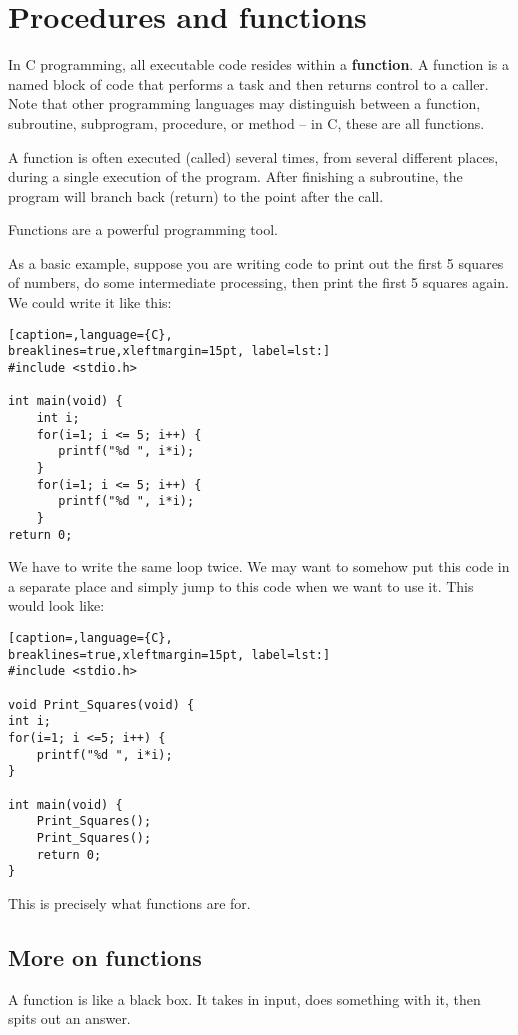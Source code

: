 \section{Procedures and functions}
In C programming, all executable code resides within a \textbf{function}. A
function is a named block of code that performs a task and then returns control
to a caller. Note that other programming languages may distinguish between a
function, subroutine, subprogram, procedure, or method --
in C, these are all functions.

A function is often executed (called) several times, from several different
places, during a single execution of the program.  After finishing a
subroutine, the program will branch back (return) to the point after the call.

Functions are a powerful programming tool.

As a basic example, suppose you are writing code to print out the first 5
squares of numbers, do some intermediate processing, then print the first 5
squares again. We could write it like this:
\lstset{basicstyle=\scriptsize, numbers=left, captionpos=b, tabsize=4}
\begin{lstlisting}[caption=,language={C},
breaklines=true,xleftmargin=15pt, label=lst:]
#include <stdio.h>

int main(void) {
	int i;
	for(i=1; i <= 5; i++) {
	   printf("%d ", i*i);
	}
	for(i=1; i <= 5; i++) {
	   printf("%d ", i*i);
	}
return 0;
\end{lstlisting}

We have to write the same loop twice. We may want to somehow put this code in a
separate place and simply jump to this code when we want to use it. This would
look like:
\lstset{basicstyle=\scriptsize, numbers=left, captionpos=b, tabsize=4}
\begin{lstlisting}[caption=,language={C},
breaklines=true,xleftmargin=15pt, label=lst:]
#include <stdio.h>

void Print_Squares(void) {
int i;
for(i=1; i <=5; i++) {
	printf("%d ", i*i);
}

int main(void) {
	Print_Squares();
	Print_Squares();
	return 0;
}
\end{lstlisting}

This is precisely what functions are for.

\subsection{More on functions}
A function is like a black box. It takes in input, does something with it, then
spits out an answer.

